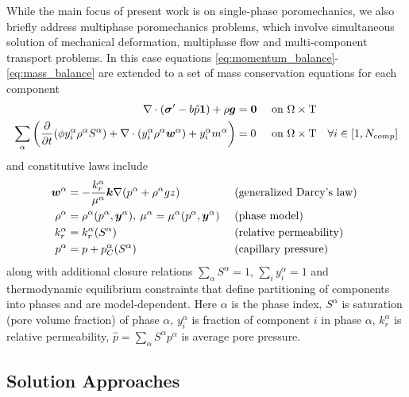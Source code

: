 While the main focus of present work is on single-phase poromechanics, we also briefly address multiphase poromechanics problems, which involve simultaneous solution of mechanical deformation, multiphase flow and multi-component transport problems.   In this case equations \eqref{eq:momentum_balance}-\eqref{eq:mass_balance} are extended to a set of mass conservation equations for each component
\begin{align}
    \nabla \cdot \left( \bm{\sigma}^\prime - b \hat{p} \bm{1} \right) + \rho\bm{g} &= \bm{0} & \mbox{ on } \Omega \times \mathrm{T} & & \label{eq:momentum_balance_mp} \\
    \sum\limits_\alpha\left(\frac{\partial}{\partial t}(\phi y_i^\alpha \rho^\alpha S^\alpha) + \nabla \cdot (y_i^\alpha \rho^\alpha \bm{w}^\alpha) + y_i^\alpha m^\alpha \right) &= 0 & \mbox{ on } \Omega \times \mathrm{T} & & \forall i \in [1,N_{comp}] \label{eq:mass_balance_mp}
\end{align}
and constitutive laws include
\begin{align}
    \bm{w}^\alpha &= - \frac{k_r^\alpha}{\mu^\alpha}\bm{k}\nabla(p^\alpha + \rho^\alpha g z) & & \mbox{ (generalized Darcy's law) } \label{eq:constitutive_darcy_mp} \\
    \rho^\alpha &= \rho^\alpha(p^\alpha,\bm{y}^\alpha), \: \mu^\alpha = \mu^\alpha(p^\alpha,\bm{y}^\alpha) & & \mbox{ (phase model) } \label{eq:constitutive_fluid_mp} \\
    k_r^\alpha &= k_r^\alpha(S^\alpha) & & \mbox{ (relative permeability) } \label{eq:constitutive_relperm_mp} \\
    p^\alpha &= p + p_C^\alpha(S^\alpha) & & \mbox{ (capillary pressure) } \label{eq:constitutive_cappres_mp}
\end{align}
along with additional closure relations $\sum_\alpha S^\alpha = 1$, $\sum_i y_i^\alpha = 1$ and thermodynamic equilibrium constraints that define partitioning of components into phases and are model-dependent.   Here $\alpha$ is the phase index, $S^\alpha$ is saturation (pore volume fraction) of phase $\alpha$, $y_i^\alpha$ is fraction of component $i$ in phase $\alpha$, $k_r^\alpha$ is relative permeability, $\hat{p} = \sum_\alpha S^\alpha p^\alpha$ is average pore pressure.

\subsection{Solution Approaches}
\label{subsec:intro_problem_solution}

